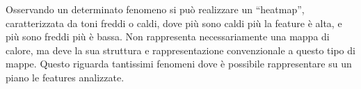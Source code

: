 \documentclass{article}
\numberwithin{equation}{subsection}
\begin{document}
Osservando un determinato fenomeno si può realizzare un ``heatmap'', caratterizzata da 
toni freddi o caldi, dove più sono caldi più la feature è alta, e più sono freddi più è 
bassa. Non rappresenta necessariamente una mappa di calore, ma deve la sua struttura e 
rappresentazione convenzionale a questo tipo di mappe. Questo riguarda tantissimi 
fenomeni dove è possibile rappresentare su un piano le features analizzate. 
\end{document}

